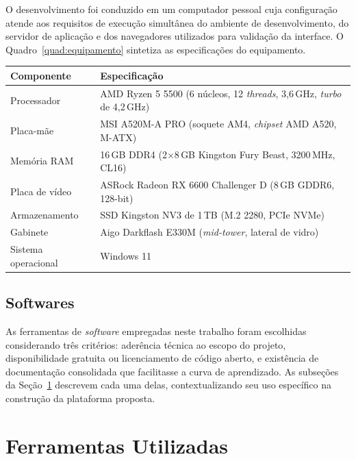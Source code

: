 O desenvolvimento foi conduzido em um computador pessoal cuja configuração atende aos requisitos de execução simultânea do ambiente de desenvolvimento, do servidor de aplicação e dos navegadores utilizados para validação da interface. O Quadro~\ref{quad:equipamento} sintetiza as especificações do equipamento.

\begin{quadro}[h!]
\caption{Configuração do equipamento utilizado no desenvolvimento}
\label{quad:equipamento}
\begin{tabular}{|p{4cm}|p{11cm}|}
\hline
\textbf{Componente} & \textbf{Especificação} \\ \hline
Processador & AMD Ryzen 5 5500 (6 núcleos, 12 \textit{threads}, 3,6\,GHz, \textit{turbo} de 4,2\,GHz) \\ \hline
Placa-mãe & MSI A520M-A PRO (soquete AM4, \textit{chipset} AMD A520, M-ATX) \\ \hline
Memória RAM & 16\,GB DDR4 (2$\times$8\,GB Kingston Fury Beast, 3200\,MHz, CL16) \\ \hline
Placa de vídeo & ASRock Radeon RX 6600 Challenger D (8\,GB GDDR6, 128-bit) \\ \hline
Armazenamento & SSD Kingston NV3 de 1\,TB (M.2 2280, PCIe NVMe) \\ \hline
Gabinete & Aigo Darkflash E330M (\textit{mid-tower}, lateral de vidro) \\ \hline
Sistema operacional & Windows 11 \\ \hline
\end{tabular}
\end{quadro}

\subsection{Softwares}

As ferramentas de \textit{software} empregadas neste trabalho foram escolhidas considerando três critérios: aderência técnica ao escopo do projeto, disponibilidade gratuita ou licenciamento de código aberto, e existência de documentação consolidada que facilitasse a curva de aprendizado. As subseções da Seção~\ref{sec:ferramentas} descrevem cada uma delas, contextualizando seu uso específico na construção da plataforma proposta.

\section{Ferramentas Utilizadas}
\label{sec:ferramentas}

